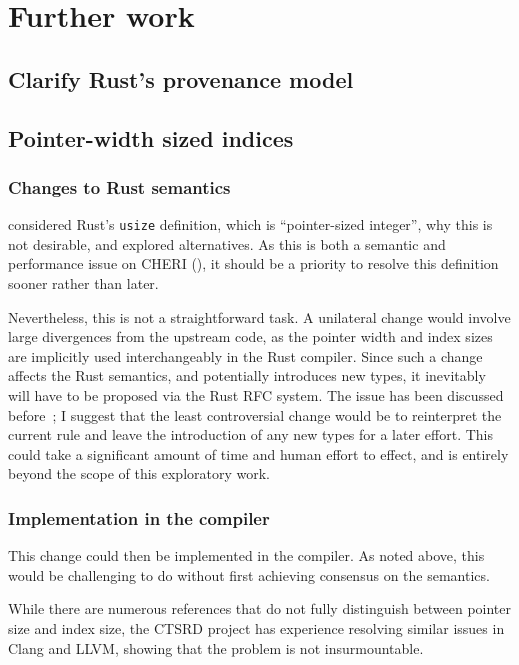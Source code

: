 \documentclass[dissertation.tex]{subfiles}
\begin{document}
\section{Further work}

\subsection{Clarify Rust's provenance model}

\subsection{Pointer-width sized indices}
\label{sec:further-usize}

\subsubsection{Changes to Rust semantics}
 considered Rust's \texttt{usize} definition, which
is ``pointer-sized integer'', why this is not desirable, and explored
alternatives.
As this is both a semantic and performance issue on CHERI
(), it should be a priority to resolve this
definition sooner rather than later.

Nevertheless, this is not a straightforward task.
A unilateral change would involve large divergences from the upstream
code, as the pointer width and index sizes are implicitly used
interchangeably in the Rust compiler.
Since such a change affects the Rust semantics, and potentially
introduces new types, it inevitably will have to be proposed via the
Rust RFC system.
The issue has been discussed before~\cite{rust-rfc-isize,rust-int-uint};
I suggest that the least controversial change would be to reinterpret
the current rule and leave the introduction of any new types for a later
effort.
This could take a significant amount of time and human effort to effect,
and is entirely beyond the scope of this exploratory work.

\subsubsection{Implementation in the compiler}
This change could then be implemented in the compiler.
As noted above, this would be challenging to do without first achieving
consensus on the semantics.

While there are numerous references that do not fully distinguish
between pointer size and index size, the CTSRD project has experience
resolving similar issues in Clang and LLVM, showing that the problem is
not insurmountable.
\end{document}

